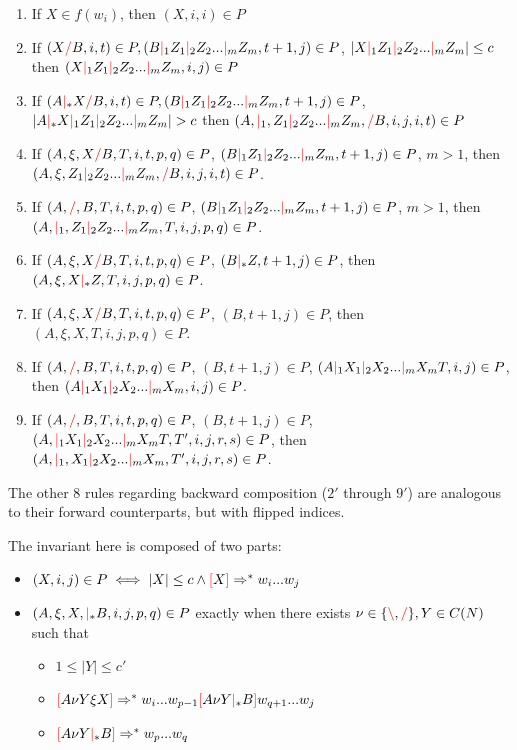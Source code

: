 \documentclass[12pt]{extarticle}
\theoremstyle{definition} \newtheorem{defn}{Definition}
\theoremstyle{definition} \newtheorem{prop}{Proposition}
\theoremstyle{definition} \newtheorem{property}{Property}
\newcommand{\lc}{\textcolor{red}{\backslash}}
\newcommand{\rc}{\textcolor{red}{/}}
\newcommand{\mc}{\textcolor{red}{|}}
\newcommand{\lb}{\textcolor{red}{[}}
\newcommand{\rb}{\textcolor{red}{]}}
\begin{document}
\begin{enumerate}
    \item If $X \in f(w_i)$, then $(X, i, i) \in P$
    \item If $(X \rc B, i, t) \in P, (B \mc_1 Z_1 \mc_2 Z_2 ... \mc_m Z_m, t + 1, j) \in P$,
        $|X \mc_1 Z_1 \mc_2 Z_2 ... \mc_m Z_m| \leq c$
        then $(X \mc_1 Z_1 \mc_2 Z_2 ... \mc_m Z_m, i, j) \in P$
    \item If $(A \mc_* X \rc B, i, t) \in P, (B \mc_1 Z_1 \mc_2 Z_2 ... \mc_m Z_m, t + 1, j) \in P$,
        $|A \mc_* X \mc_1 Z_1 \mc_2 Z_2 ... \mc_m Z_m| > c$
        then $(A, \mc_1, Z_1 \mc_2 Z_2 ... \mc_m Z_m, \rc B, i, j, i, t) \in P$
    \item If $(A, \xi, X \rc B, T, i, t, p, q) \in P$,
        $(B \mc_1 Z_1 \mc_2 Z_2 ... \mc_m Z_m, t + 1, j) \in P$,
        $m > 1$, then $(A, \xi, Z_1 \mc_2 Z_2 ... \mc_m Z_m, \rc B, i, j, i, t) \in P$.
    \item If $(A, \rc, B, T, i, t, p, q) \in P$,
        $(B \mc_1 Z_1 \mc_2 Z_2 ... \mc_m Z_m, t + 1, j) \in P$,
        $m > 1$, then $(A, \mc_1, Z_1 \mc_2 Z_2 ... \mc_m Z_m, T, i, j, p, q) \in P$.
    \item If $(A, \xi, X \rc B, T, i, t, p, q) \in P$,
        $(B \mc_* Z, t + 1, j) \in P$,
        then $(A, \xi, X \mc_* Z, T, i, j, p, q) \in P$.
    \item If $(A, \xi, X \rc B, T, i, t, p, q) \in P$,
        $(B, t + 1, j) \in P$,
        then $(A, \xi, X, T, i, j, p, q) \in P$.
    \item If $(A, \rc, B, T, i, t, p, q) \in P$,
        $(B, t + 1, j) \in P$, $(A \mc_1 X_1 \mc_2 X_2 ... \mc_m X_m T, i, j) \in P$,
        then $(A \mc_1 X_1 \mc_2 X_2 ... \mc_m X_m, i, j) \in P$.
    \item If $(A, \rc, B, T, i, t, p, q) \in P$,
        $(B, t + 1, j) \in P$, $(A, \mc_1 X_1 \mc_2 X_2 ... \mc_m X_m T, T', i, j, r, s) \in P$,
        then $(A, \mc_1, X_1 \mc_2 X_2 ... \mc_m X_m, T', i, j, r, s) \in P$.
\end{enumerate}

The other 8 rules regarding backward composition
($2'$ through $9'$) are analogous to their forward counterparts, but with
flipped indices.

The invariant here is composed of two parts:

\begin{itemize}
    \item $(X, i, j) \in P \iff |X| \leq c \land \lb X \rb \Rightarrow^* w_i ... w_j$
    \item $(A, \xi, X, \mc_* B, i, j, p, q) \in P$
        exactly when there exists $\nu \in \{ \lc, \rc \}, Y \in C(N)$ such that
        \begin{itemize}
            \item $1 \leq |Y| \leq c'$
            \item $\lb A \nu Y \xi X \rb \Rightarrow^* w_i ... w_{p - 1} \lb A \nu Y \mc_* B \rb w_{q + 1} ... w_j$
            \item $\lb A \nu Y \mc_* B \rb \Rightarrow^* w_p ... w_q$
        \end{itemize}
\end{itemize}
\end{document}
